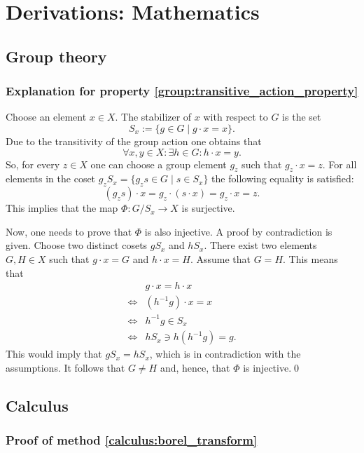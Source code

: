 \chapter{Derivations: Mathematics}

\section{Group theory}
\subsection{Explanation for property \ref{group:transitive_action_property}}\label{proof:stabilizer}

    Choose an element $x\in X$. The stabilizer of $x$ with respect to $G$ is the set \[S_x := \{g\in G\mid g\cdot x = x\}.\] Due to the transitivity of the group action one obtains that \[\forall x, y\in X: \exists h\in G: h\cdot x = y.\] So, for every $z\in X$ one can choose a group element $g_z$ such that $g_z\cdot x = z$. For all elements in the coset $g_zS_x = \{g_zs\in G\mid s\in S_x\}$ the following equality is satisfied: \[(g_zs)\cdot x = g_z\cdot (s\cdot x) = g_z\cdot x = z.\] This implies that the map $\Phi:G/S_x \rightarrow X$ is surjective.

    Now, one needs to prove that $\Phi$ is also injective. A proof by contradiction is given. Choose two distinct cosets $gS_x$ and $hS_x$. There exist two elements $G,H\in X$ such that $g\cdot x = G$ and $h\cdot x = H$. Assume that $G = H$. This means that
    \begin{align*}
        &g\cdot x = h\cdot x\\
        \iff&(h^{-1}g)\cdot x = x\\
        \iff&h^{-1}g\in S_x\\
        \iff&hS_x\ni h(h^{-1}g) = g.
    \end{align*}
    This would imply that $gS_x = hS_x$, which is in contradiction with the assumptions. It follows that $G\neq H$ and, hence, that $\Phi$ is injective.\qed

\section{Calculus}
\subsection{Proof of method \ref{calculus:borel_transform}}

